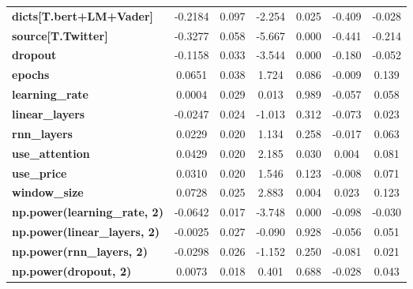\begin{center}
\begin{tabular}{lcccccc}
\textbf{dicts[T.bert+LM+Vader]}      &      -0.2184  &        0.097     &    -2.254  &         0.025        &       -0.409    &       -0.028     \\
\textbf{source[T.Twitter]}           &      -0.3277  &        0.058     &    -5.667  &         0.000        &       -0.441    &       -0.214     \\
\textbf{dropout}                     &      -0.1158  &        0.033     &    -3.544  &         0.000        &       -0.180    &       -0.052     \\
\textbf{epochs}                      &       0.0651  &        0.038     &     1.724  &         0.086        &       -0.009    &        0.139     \\
\textbf{learning\_rate}              &       0.0004  &        0.029     &     0.013  &         0.989        &       -0.057    &        0.058     \\
\textbf{linear\_layers}              &      -0.0247  &        0.024     &    -1.013  &         0.312        &       -0.073    &        0.023     \\
\textbf{rnn\_layers}                 &       0.0229  &        0.020     &     1.134  &         0.258        &       -0.017    &        0.063     \\
\textbf{use\_attention}              &       0.0429  &        0.020     &     2.185  &         0.030        &        0.004    &        0.081     \\
\textbf{use\_price}                  &       0.0310  &        0.020     &     1.546  &         0.123        &       -0.008    &        0.071     \\
\textbf{window\_size}                &       0.0728  &        0.025     &     2.883  &         0.004        &        0.023    &        0.123     \\
\textbf{np.power(learning\_rate, 2)} &      -0.0642  &        0.017     &    -3.748  &         0.000        &       -0.098    &       -0.030     \\
\textbf{np.power(linear\_layers, 2)} &      -0.0025  &        0.027     &    -0.090  &         0.928        &       -0.056    &        0.051     \\
\textbf{np.power(rnn\_layers, 2)}    &      -0.0298  &        0.026     &    -1.152  &         0.250        &       -0.081    &        0.021     \\
\textbf{np.power(dropout, 2)}        &       0.0073  &        0.018     &     0.401  &         0.688        &       -0.028    &        0.043     \\

\end{tabular}
\end{center}
